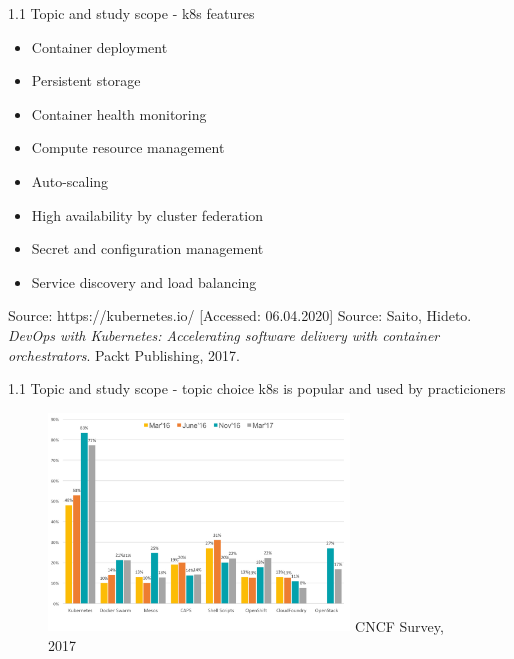 \documentclass{beamer}
\begin{document}
\begin{frame}{1.1 Topic and study scope - k8s features}%
\begin{itemize}
	\item Container deployment
	\item Persistent storage
	\item Container health monitoring
	\item Compute resource management
	\item Auto-scaling
	\item High availability by cluster federation
	\item Secret and configuration management
	\item Service discovery and load balancing
\end{itemize}

\tiny{Source: https://kubernetes.io/ [Accessed: 06.04.2020]} 
\tiny{Source: Saito, Hideto. \textit{DevOps with Kubernetes: Accelerating software delivery with container orchestrators}. Packt Publishing, 2017.}
\end{frame}

\begin{frame}{1.1 Topic and study scope - topic choice}%
k8s is popular and used by practicioners
\begin{figure}
	\includegraphics[width=8cm]{figures/cncf-container-orchestrators.png}
	\label{fig:cncf-container-orchestrators}
	\tiny{CNCF Survey, 2017}
\end{figure}
\end{frame}
	
\end{document}
